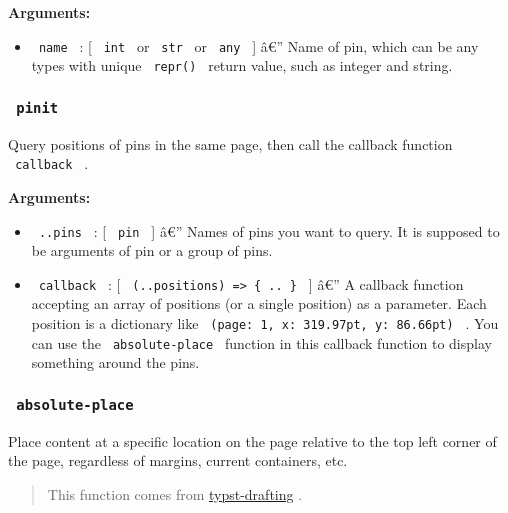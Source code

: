 \textbf{Arguments:}

\begin{itemize}
\tightlist
\item
  \texttt{\ name\ } : {[} \texttt{\ int\ } or \texttt{\ str\ } or
  \texttt{\ any\ } {]} â€'' Name of pin, which can be any types with
  unique \texttt{\ repr()\ } return value, such as integer and string.
\end{itemize}

\subsubsection{\texorpdfstring{\texttt{\ pinit\ }}{ pinit }}\label{pinit-1}

Query positions of pins in the same page, then call the callback
function \texttt{\ callback\ } .

\begin{Shaded}
\begin{Highlighting}[]
\end{Highlighting}
\end{Shaded}

\textbf{Arguments:}

\begin{itemize}
\tightlist
\item
  \texttt{\ ..pins\ } : {[} \texttt{\ pin\ } {]} â€'' Names of pins you
  want to query. It is supposed to be arguments of pin or a group of
  pins.
\item
  \texttt{\ callback\ } : {[}
  \texttt{\ (..positions)\ =\textgreater{}\ \{\ ..\ \}\ } {]} â€'' A
  callback function accepting an array of positions (or a single
  position) as a parameter. Each position is a dictionary like
  \texttt{\ (page:\ 1,\ x:\ 319.97pt,\ y:\ 86.66pt)\ } . You can use the
  \texttt{\ absolute-place\ } function in this callback function to
  display something around the pins.
\end{itemize}

\subsubsection{\texorpdfstring{\texttt{\ absolute-place\ }}{ absolute-place }}\label{absolute-place}

Place content at a specific location on the page relative to the top
left corner of the page, regardless of margins, current containers, etc.

\begin{quote}
This function comes from
\href{https://github.com/ntjess/typst-drafting}{typst-drafting} .
\end{quote}

